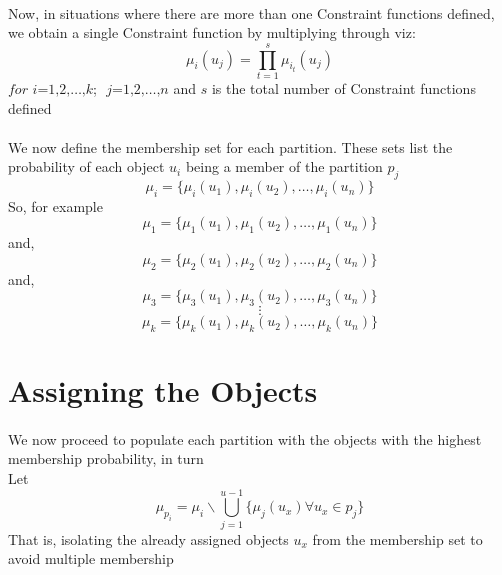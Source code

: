 \documentclass[a4paper,openany]{book}
\begin{document}
			\paragraph{}
				Now, in situations where there are more than one Constraint functions defined, we obtain a single Constraint function by multiplying through viz:
				\begin{equation}
					\mu_i(u_j) = \prod_{t=1}^{s}{\mu_{i_t}(u_j)}
				\end{equation}
				$\textit{for i=1,2,}\dots\text{,}k$; $\textit{ j=1,2,}\dots\text{,}n$ and $s$ is the total number of Constraint functions defined
			\paragraph{}
				We now define the membership set for each partition. These sets list the probability of each object $u_i$ being a member of the partition $p_j$
				\begin{equation}
					\mu_i = \{ \mu_i(u_1), \mu_i(u_2),\dots,\mu_i(u_n) \}
				\end{equation}
				So, for example
				\begin{equation}
					\mu_1 = \{ \mu_1(u_1), \mu_1(u_2),\dots,\mu_1(u_n) \}
				\end{equation}
				and,
				\begin{equation}
					\mu_2 = \{ \mu_2(u_1), \mu_2(u_2),\dots,\mu_2(u_n) \}
				\end{equation}
				and,
				\begin{equation}
					\mu_3 = \{ \mu_3(u_1), \mu_3(u_2),\dots,\mu_3(u_n) \}
				\end{equation}
				\[
					\vdots
				\]
				\begin{equation}
					\mu_k = \{ \mu_k(u_1), \mu_k(u_2),\dots,\mu_k(u_n) \}
				\end{equation}
		\section{Assigning the Objects}
			\paragraph{}
				We now proceed to populate each partition with the objects with the highest membership probability, in turn \\
				Let
				\begin{equation}
					\mu_{p_i} = \mu_i \backslash \bigcup_{j=1}^{u-1}{ \{ \mu_j(u_x) \forall u_x \in p_j \} }
				\end{equation}
				That is, isolating the already assigned objects $u_x$ from the membership set to avoid multiple membership
\end{document}
